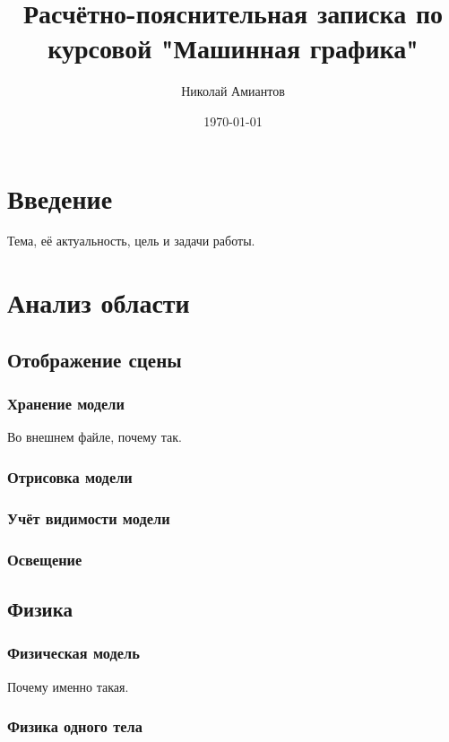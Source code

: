 \documentclass[a4paper,12pt]{report}
\title{Расчётно-пояснительная записка по курсовой "Машинная графика"}
\author{Николай Амиантов}
\date{\today}
\begin{document}
\maketitle

\section{Введение}

Тема, её актуальность, цель и задачи работы.

\section{Анализ области}

\subsection{Отображение сцены}

\subsubsection{Хранение модели}

Во внешнем файле, почему так.

\subsubsection{Отрисовка модели}

\subsubsection{Учёт видимости модели}

\subsubsection{Освещение}

\subsection{Физика}

\subsubsection{Физическая модель}

Почему именно такая.

\subsubsection{Физика одного тела}
\end{document}
